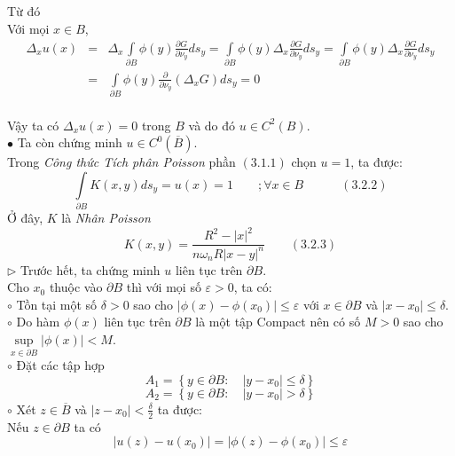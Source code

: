 Từ đó\\
Với mọi $x \in B$,
\begin{eqnarray}
\Delta _x u\left( x \right)& = &\Delta _x \int\limits_{\partial B} {\phi \left( y \right)\frac{{\partial G}}
{{\partial \nu _y }}ds_y }  = \int\limits_{\partial B} {\phi \left( y \right)\Delta _x \frac{{\partial G}}
{{\partial \nu _y }}ds_y }  = \int\limits_{\partial B} {\phi \left( y \right)\Delta _x \frac{{\partial G}}
{{\partial \nu _y }}ds_y } \nonumber\\
& = &\int\limits_{\partial B} {\phi \left( y \right)\frac{\partial }
{{\partial \nu _y }}\left( {\Delta _x G} \right)ds_y }  = 0 \nonumber
\end{eqnarray}
\\Vậy ta có $
\Delta _x u\left( x \right) = 0
$ trong $B$ và do đó $
u \in C^2 \left( B \right)
$.\\
$\bullet$ Ta còn chứng minh $
u \in C^0 \left( {\overline B } \right)
$.\\
Trong \textit{Công thức Tích phân Poisson} phần $
\left( {3.1.1} \right)
$ chọn $u=1$, ta được:
\[
\int\limits_{\partial B} {K\left( {x,y} \right)ds_y }  = u\left( x \right) = 1\quad \quad ;\forall x \in B\quad \quad \quad \left( {3.2.2} \right)
\]
Ở đây, $K$ là \textit{Nhân Poisson}
\[
K\left( {x,y} \right) = \frac{{R^2  - \left| x \right|^2 }}
{{n\omega _n R\left| {x - y} \right|^n }}\quad \quad \left( {3.2.3} \right)
\]
$\triangleright$ Trước hết, ta chứng minh $u$ liên tục trên $
{\partial B}
$.\\
Cho $x_0$ thuộc vào $
{\partial B}
$ thì với mọi số $\varepsilon > 0$, ta có:\\
$\circ$ Tồn tại một số $\delta >0$ sao cho $
\left| {\phi \left( x \right) - \phi \left( {x_0 } \right)} \right| \leqslant \varepsilon 
$ với $
x \in \partial B
$ và $
\left| {x - x_0 } \right| \leqslant \delta 
$.\\
$\circ$ Do hàm $
{\phi \left( x \right)}
$ liên tục trên $
\partial B
$ là một tập Compact nên có số $M>0$ sao cho $
\mathop {\sup }\limits_{x \in \partial B} \left| {\phi \left( x \right)} \right| < M
$.\\
$\circ$ Đặt các tập hợp
\[
A_1  = \left\{ {y \in \partial B:\quad \left| {y - x_0 } \right| \leqslant \delta } \right\}
\]
\[
A_2  = \left\{ {y \in \partial B:\quad \left| {y - x_0 } \right| > \delta } \right\}
\]
$\circ$ Xét $
z \in \overline B 
$ và $
\left| {z - x_0 } \right| < \frac{\delta }
{2}
$ ta được:\\
Nếu $
z \in \partial B
$ ta có \[
\left| {u\left( z \right) - u\left( {x_0 } \right)} \right| = \left| {\phi \left( z \right) - \phi \left( {x_0 } \right)} \right| \leqslant \varepsilon 
\]
